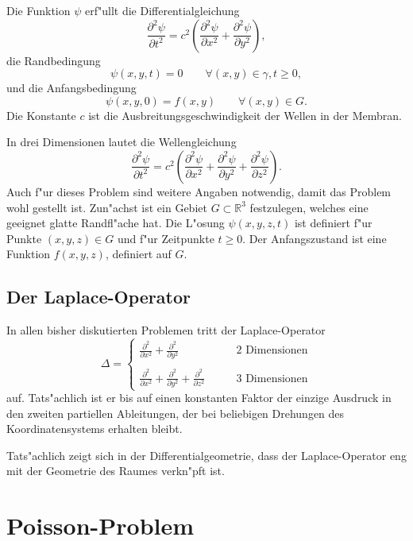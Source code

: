 Die Funktion $\psi$
erf"ullt die Differentialgleichung
\[
\frac{\partial^2\psi}{\partial t^2}
=c^2\left(\frac{\partial^2\psi}{\partial x^2}+\frac{\partial^2\psi}{\partial y^2}\right),
\]
die Randbedingung
\[
\psi(x,y,t)=0\qquad \forall (x,y)\in\gamma,t\ge 0,
\]
und die Anfangsbedingung
\[
\psi(x,y,0)=f(x,y)\qquad \forall (x,y)\in G.
\]
Die Konstante $c$ ist die Ausbreitungsgeschwindigkeit der Wellen in der Membran.

In drei Dimensionen lautet
die Wellengleichung 
\[
\frac{\partial^2\psi}{\partial t^2}
=c^2\left(\frac{\partial^2\psi}{\partial x^2}
+\frac{\partial^2\psi}{\partial y^2}
+\frac{\partial^2\psi}{\partial z^2}
\right).
\]
Auch f"ur dieses Problem sind weitere Angaben notwendig, damit das Problem
wohl gestellt ist.
Zun"achst ist ein Gebiet $G\subset \mathbb R^3$ festzulegen, welches
eine geeignet glatte Randfl"ache hat.
Die L"osung $\psi(x,y,z,t)$ ist definiert f"ur Punkte $(x,y,z)\in G$
und f"ur Zeitpunkte $t\ge 0$.
Der Anfangszustand ist eine Funktion $f(x,y,z)$,
definiert auf $G$.

\subsection{Der Laplace-Operator}
In allen bisher diskutierten Problemen tritt der Laplace-Operator
\[
\Delta
=
\begin{cases}
\displaystyle
\frac{\partial^2}{\partial x^2}
+\frac{\partial^2}{\partial y^2}&\qquad\text{2 Dimensionen}\\
\\
\displaystyle
\frac{\partial^2}{\partial x^2}
+\frac{\partial^2}{\partial y^2}
+\frac{\partial^2}{\partial z^2}&\qquad\text{3 Dimensionen}
\end{cases}
\]
auf. Tats"achlich ist er bis auf einen konstanten Faktor der einzige Ausdruck
in den zweiten partiellen Ableitungen, der bei beliebigen Drehungen des
Koordinatensystems erhalten bleibt.

Tats"achlich zeigt sich in der Differentialgeometrie, dass der Laplace-Operator
eng mit der Geometrie des Raumes verkn"pft ist.

\section{Poisson-Problem}

